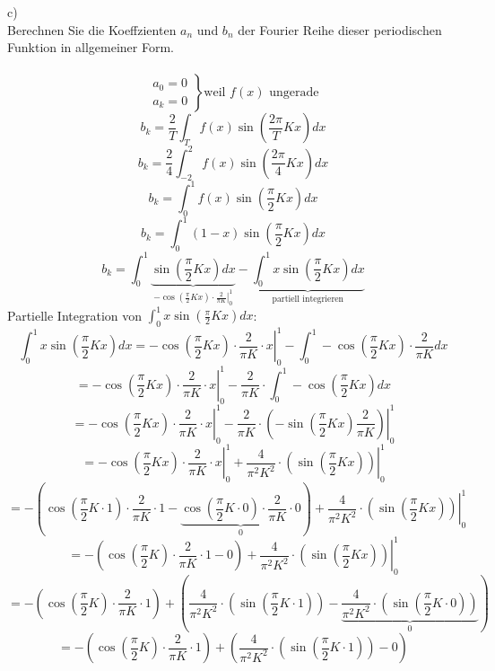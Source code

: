 c)\\
Berechnen Sie die Koeffzienten $a_n$ und $b_n$ der Fourier Reihe dieser periodischen Funktion in allgemeiner Form.\\\\
\[ \left. \begin{matrix}
a_0 = 0\\
a_k = 0
\end{matrix} \right\} \text{weil $f(x)$ ungerade} \]
\[ b_k = \frac{2}{T} \int_{T}^{} f(x) \sin\left(\frac{2 \pi}{T} K x\right) dx \]
\[ b_k = \frac{2}{4} \int_{-2}^{2} f(x) \sin\left(\frac{2 \pi}{4} K x\right) dx \]
\[ b_k = \int_{0}^{1} f(x) \sin\left(\frac{\pi}{2} K x\right) dx \]
\[ b_k = \int_{0}^{1} (1 - x) \sin\left(\frac{\pi}{2} K x\right) dx \]
\[ b_k = \int_{0}^{1} \underbrace{\sin\left(\frac{\pi}{2} K x\right) dx}_{\left.-\cos\left(\frac{\pi}{2}K x\right) \cdot \frac{2}{\pi K}\right|_0^1} - \underbrace{\int_{0}^{1} x \sin\left(\frac{\pi}{2} K x\right) dx}_{\text{partiell integrieren}} \]
Partielle Integration von $\int_{0}^{1} x \sin\left(\frac{\pi}{2} K x\right) dx$: 
\[ \int_{0}^{1} x \sin\left(\frac{\pi}{2} K x\right) dx = \left.-\cos\left(\frac{\pi}{2}Kx\right) \cdot \frac{2}{\pi K} \cdot x\right|_0^1 - \int_{0}^{1} -\cos\left(\frac{\pi}{2}Kx\right) \cdot \frac{2}{\pi K} dx \]
\[ = \left.-\cos\left(\frac{\pi}{2}Kx\right) \cdot \frac{2}{\pi K} \cdot x\right|_0^1 - \frac{2}{\pi K} \cdot \int_{0}^{1} -\cos\left(\frac{\pi}{2}Kx\right)  dx \]
\[ = \left.-\cos\left(\frac{\pi}{2}Kx\right) \cdot \frac{2}{\pi K} \cdot x\right|_0^1 - \left.\frac{2}{\pi K} \cdot \left(-\sin\left(\frac{\pi}{2}Kx\right)\frac{2}{\pi K}\right)\right|_0^1 \]
\[ = \left.-\cos\left(\frac{\pi}{2}Kx\right) \cdot \frac{2}{\pi K} \cdot x\right|_0^1 + \left.\frac{4}{\pi^2 K^2} \cdot \left(\sin\left(\frac{\pi}{2}Kx\right)\right)\right|_0^1 \]
\[ = -\left(\cos\left(\frac{\pi}{2}K \cdot 1\right) \cdot \frac{2}{\pi K} \cdot 1 - \underbrace{\cos\left(\frac{\pi}{2}K \cdot 0\right) \cdot \frac{2}{\pi K} \cdot 0}_0\right) + 
\left.\frac{4}{\pi^2 K^2} \cdot \left(\sin\left(\frac{\pi}{2}Kx\right)\right)\right|_0^1 \]
\[ = -\left(\cos\left(\frac{\pi}{2}K\right) \cdot \frac{2}{\pi K} \cdot 1 - 0\right) + 
\left.\frac{4}{\pi^2 K^2} \cdot \left(\sin\left(\frac{\pi}{2}Kx\right)\right)\right|_0^1 \]
\[ = -\left(\cos\left(\frac{\pi}{2}K\right) \cdot \frac{2}{\pi K} \cdot 1\right) + 
\left(\frac{4}{\pi^2 K^2} \cdot \left(\sin\left(\frac{\pi}{2}K \cdot 1\right)\right) - \underbrace{\frac{4}{\pi^2 K^2} \cdot \left(\sin\left(\frac{\pi}{2}K \cdot 0\right)\right)}_0\right) \]
\[ = -\left(\cos\left(\frac{\pi}{2}K\right) \cdot \frac{2}{\pi K} \cdot 1\right) + 
\left(\frac{4}{\pi^2 K^2} \cdot \left(\sin\left(\frac{\pi}{2}K \cdot 1\right)\right) - 0\right) \]
